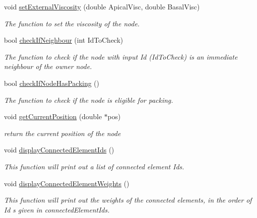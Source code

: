 \begin{DoxyCompactItemize}
\item 
void \hyperlink{classNode_a9a3b878b16fe5be6ee707a49f3fd7d5a}{set\+External\+Viscosity} (double Apical\+Visc, double Basal\+Visc)
\begin{DoxyCompactList}\small\item\em The function to set the viscosity of the node. \end{DoxyCompactList}\item 
bool \hyperlink{classNode_a7dc5a9838a0a1963e58f648c5f7cb635}{check\+If\+Neighbour} (int Id\+To\+Check)
\begin{DoxyCompactList}\small\item\em The function to check if the node with input Id (Id\+To\+Check) is an immediate neighbour of the owner node. \end{DoxyCompactList}\item 
bool \hyperlink{classNode_a1d80e6f467d8ca919872b6e47a882dd5}{check\+If\+Node\+Has\+Packing} ()
\begin{DoxyCompactList}\small\item\em The function to check if the node is eligible for packing. \end{DoxyCompactList}\item 
void \hyperlink{classNode_ae4a2d9e601432a998efe24e1ac4a86cd}{get\+Current\+Position} (double $\ast$pos)
\begin{DoxyCompactList}\small\item\em return the current position of the node \end{DoxyCompactList}\item 
void \hyperlink{classNode_a3030a518aa97bd50060b8733e87540f7}{display\+Connected\+Element\+Ids} ()
\begin{DoxyCompactList}\small\item\em This function will print out a list of connected element Id\textquotesingle{}s. \end{DoxyCompactList}\item 
void \hyperlink{classNode_a755e8c3d76e7f1f0ab364fc3d4da3a9a}{display\+Connected\+Element\+Weights} ()
\begin{DoxyCompactList}\small\item\em This function will print out the weights of the connected elements, in the order of Id s given in connected\+Element\+Ids. \end{DoxyCompactList}\end{DoxyCompactItemize}
